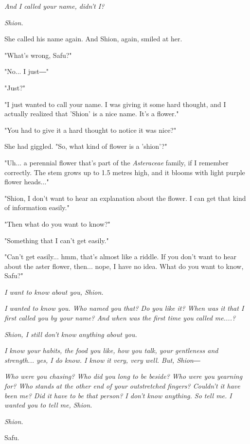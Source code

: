 \emph{And I called your name, didn't I?}

\emph{Shion.}

\myspace

She called his name again. And Shion, again, smiled at her.

"What's wrong, Safu?"

"No... I just―"

"Just?"

"I just wanted to call your name. I was giving it some hard thought, and
I actually realized that 'Shion' is a nice name. It's a flower."

"You had to give it a hard thought to notice it was nice?"

She had giggled. "So, what kind of flower is a 'shion'?"

"Uh... a perennial flower that's part of the \emph{Asteraceae} family, if I
remember correctly. The stem grows up to 1.5 metres high, and it blooms
with light purple flower heads..."

"Shion, I don't want to hear an explanation about the flower. I can get
that kind of information easily."

"Then what do you want to know?"

"Something that I can't get easily."

"Can't get easily... hmm, that's almost like a riddle. If you don't want
to hear about the aster flower, then... nope, I have no idea. What do
you want to know, Safu?"

\emph{I want to know about you, Shion.}

\emph{I wanted to know you. Who named you that? Do you like it? When was
	it that I first called you by your name? And when was the first time you
	called me....?}

\emph{Shion, I still don't know anything about you.}

\emph{I know your habits, the food you like, how you talk, your
	gentleness and strength... yes, I do know. I know it very, very well.
	But, Shion―}

\emph{Who were you chasing? Who did you long to be beside? Who were you
	yearning for? Who stands at the other end of your outstretched fingers?
	Couldn't it have been me? Did it have to be that person? I don't know
	anything. So tell me. I wanted you to tell me, Shion.}

\emph{Shion.}

\myspace

Safu.

